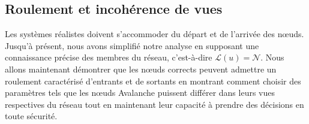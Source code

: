 \documentclass[a4,twocolumn,10pt]{article}
\theoremstyle{definition}
\begin{document}
\begin{appendices}
\subsection{Roulement et incohérence de vues}\label{sec:full-analysis-churn}

Les systèmes réalistes doivent s'accommoder du départ et de l'arrivée des nœuds.
Jusqu'à présent, nous avons simplifié notre analyse en supposant une connaissance précise des membres du réseau, c'est-à-dire $\mathcal{L}(u) = \mathcal{N}$.
Nous allons maintenant démontrer que les nœuds corrects peuvent admettre un roulement caractérisé d'entrants et de sortants en montrant comment choisir des paramètres tels que les nœuds Avalanche puissent différer dans leurs vues respectives du réseau tout en maintenant leur capacité à prendre des décisions en toute sécurité.

{\color{black} 

}
\end{appendices}
\end{document}
